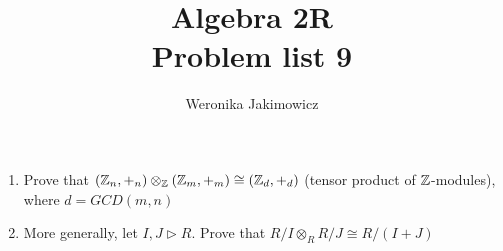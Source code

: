 \documentclass{article}
\title{Algebra 2R\\{\normalsize Problem list 9}}
\author{Weronika Jakimowicz}
\date{}
\begin{document}
\maketitle
\thispagestyle{empty}

\begin{problem}{}
  \begin{enumerate}[label=(\alph*)] $ $\newline
    \item Prove that $(\mathbb{Z}_n,+_n)\otimes_{\mathbb{Z}}(\mathbb{Z}_m,+_m)\cong(\mathbb{Z}_d,+_d)$ (tensor product of $\mathbb{Z}$-modules), where $d=GCD(m,n)$
    \item More generally, let $I,J\triangleright R$. Prove that $R/I\otimes_R R/J\cong R/(I+J)$
  \end{enumerate}
\end{problem}
\end{document}

